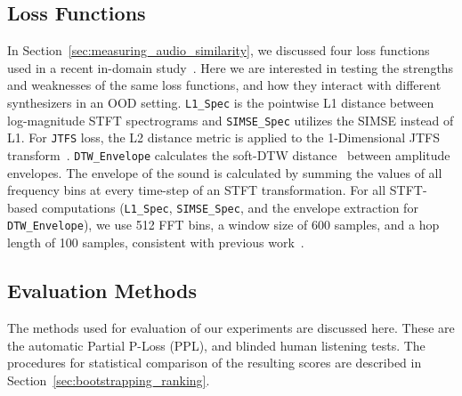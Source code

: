 \documentclass[10pt]{article} %
\newcommand{\anon}[1]{\textcolor[RGB]{255,50,150}{#1}}
\newcommand{\SIMSESpec}{\texttt{SIMSE\_\allowbreak Spec}\xspace}
\newcommand{\LoneSpec}{\texttt{L1\_\allowbreak Spec}\xspace}
\newcommand{\JTFS}{\texttt{JTFS}\xspace}
\newcommand{\DTWEnv}{\texttt{DTW\_\allowbreak Envelope}\xspace}
\begin{document}
\subsection{Loss Functions}
\label{subsec:loss_functions}
In Section~\ref{sec:measuring_audio_similarity}, we discussed four loss functions used in \anon{a recent in-domain study}~\cite{salimi2025evaluating}. Here we are interested in testing the strengths and weaknesses of the same loss functions, and how they interact with different synthesizers in an OOD setting. \LoneSpec is the pointwise L1 distance between log-magnitude STFT spectrograms and \SIMSESpec utilizes the SIMSE instead of L1. For \JTFS loss, the L2 distance metric is applied to the 1-Dimensional JTFS transform~\cite{kymatio}. \DTWEnv calculates the soft-DTW  distance~\cite{softdtw_jax,cuturi2017soft} between amplitude envelopes. The envelope of the sound is calculated by summing the values of all frequency bins at every time-step of an STFT transformation. For all STFT-based computations (\LoneSpec, \SIMSESpec, and the envelope extraction for \DTWEnv), we use 512 FFT bins, a window size of 600 samples, and a hop length of 100 samples, consistent with previous work~\cite{salimi2025evaluating}.


\subsection{Evaluation Methods}
\label{subsec:evaluation}
The methods used for evaluation of our experiments are discussed here. These are the automatic Partial P-Loss (PPL), and blinded human listening tests. The procedures for statistical comparison of the resulting scores are described in Section~\ref{sec:bootstrapping_ranking}.

\end{document}
